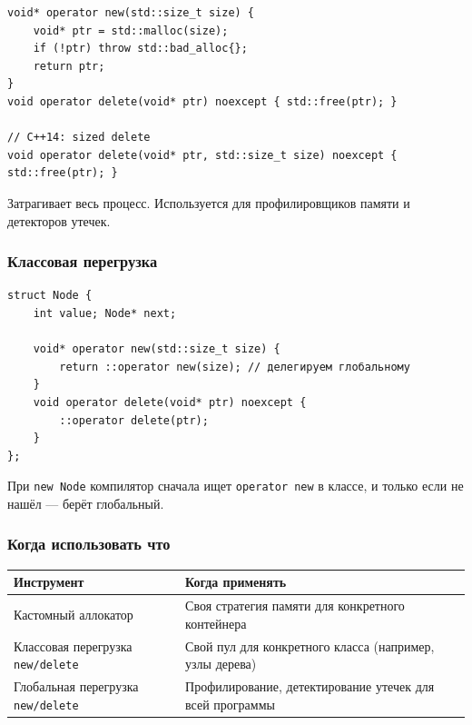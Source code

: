 \documentclass[a4paper,12pt]{article}
\begin{document}
\begin{lstlisting}
void* operator new(std::size_t size) {
    void* ptr = std::malloc(size);
    if (!ptr) throw std::bad_alloc{};
    return ptr;
}
void operator delete(void* ptr) noexcept { std::free(ptr); }

// C++14: sized delete
void operator delete(void* ptr, std::size_t size) noexcept { std::free(ptr); }
\end{lstlisting}

Затрагивает весь процесс. Используется для профилировщиков памяти и
детекторов утечек.

\subsubsection{Классовая перегрузка}

\begin{lstlisting}
struct Node {
    int value; Node* next;

    void* operator new(std::size_t size) {
        return ::operator new(size); // делегируем глобальному
    }
    void operator delete(void* ptr) noexcept {
        ::operator delete(ptr);
    }
};
\end{lstlisting}

При \texttt{new Node} компилятор сначала ищет \texttt{operator new}
в классе, и только если не нашёл --- берёт глобальный.

\subsubsection{Когда использовать что}

\begin{center}
\begin{tabular}{lp{7.5cm}}
\toprule
\textbf{Инструмент} & \textbf{Когда применять} \\
\midrule
Кастомный аллокатор
    & Своя стратегия памяти для конкретного контейнера \\
\addlinespace
Классовая перегрузка \texttt{new/delete}
    & Свой пул для конкретного класса (например, узлы дерева) \\
\addlinespace
Глобальная перегрузка \texttt{new/delete}
    & Профилирование, детектирование утечек для всей программы \\
\bottomrule
\end{tabular}
\end{center}
\end{document}
